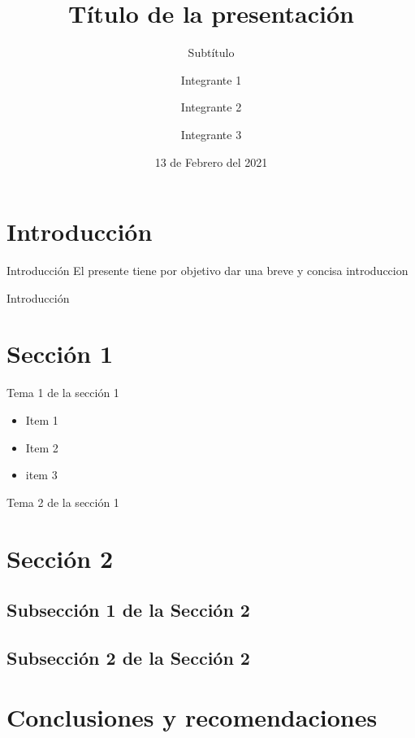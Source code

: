 \documentclass{beamer}
\title{Título de la presentación}
\subtitle{Subtítulo} %
\author{Integrante 1 \and Integrante 2 \and Integrante 3}
\institute[E.P.N]{Escuela Politécnica Nacional \par Facultad de Ingeniería en Sistemas \par Nombre de la materia}
\date{13 de Febrero del 2021} %
\begin{document}
    \frame{\titlepage}

    \frame{\tableofcontents}


    \section{Introducción}
    \begin{frame}{Introducción}
        El presente tiene por objetivo dar una breve y concisa introduccion
    \end{frame}
    \begin{frame}{Introducción}
    \end{frame}


    \section{Sección 1}
    \begin{frame}{Tema 1 de la sección 1}
	    \begin{itemize}
            \item Item 1
            \item Item 2
            \item item 3
        \end{itemize}
    \end{frame}
    \begin{frame}{Tema 2 de la sección 1}
    \end{frame}


    \section{Sección 2}
    \subsection{Subsección 1 de la Sección 2}
    \subsection{Subsección 2 de la Sección 2}


    \section{Conclusiones y recomendaciones}
\end{document}
